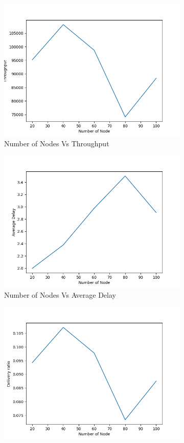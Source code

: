 \begin{figure}[h]
\begin{subfigure}{.5\textwidth}
  \centering
  \includegraphics[width=.8\linewidth]{_11_2_mobile/NumberofNodevsThroughput.png}
     \caption{Number of Nodes Vs Throughput}
    \label{node_throughput_mobile}
\end{subfigure}
\begin{subfigure}{.5\textwidth}
  \centering
  \includegraphics[width=.8\linewidth]{_11_2_mobile/NumberofNodevsAverageDelay.png}
    \caption{Number of Nodes Vs Average Delay}
     \label{node_delay_mobile}
\end{subfigure}
\begin{subfigure}{.5\textwidth}
  \centering
  \includegraphics[width=.8\linewidth]{_11_2_mobile/NumberofNodevsDeliveryRatio.png}

\end{subfigure}
\end{figure}
